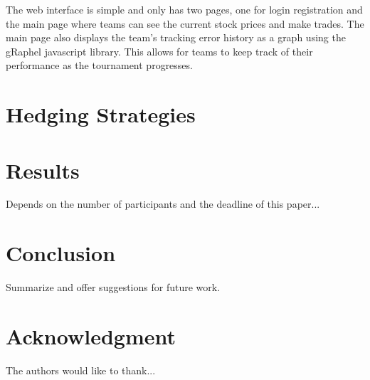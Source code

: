 \documentclass[conference, draftcls]{IEEEtran}
\begin{document}
The web interface is simple and only has two pages, one for login \/ registration and the main page where teams can see the current stock prices and make trades. The main page also displays the team’s tracking error history as a graph using the gRaphel javascript library. This allows for teams to keep track of their performance as the tournament progresses. 
\section{Hedging Strategies}

\section{Results}
Depends on the number of participants and the deadline of this paper...

\section{Conclusion}
Summarize and offer suggestions for future work.

\section*{Acknowledgment}
The authors would like to thank...



\end{document}

